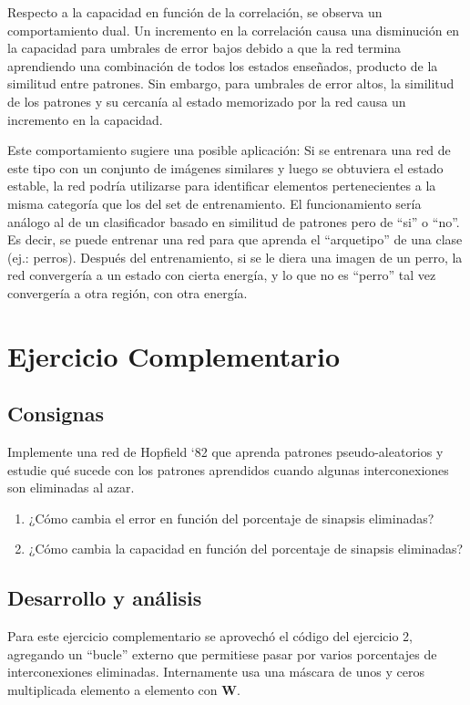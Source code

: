 \documentclass[11pt]{article} %
\begin{document}
Respecto a la capacidad en función de la correlación, se observa un comportamiento dual. Un incremento en la correlación causa una disminución en la capacidad para umbrales de error bajos debido a que la red termina aprendiendo una combinación de todos los estados enseñados, producto de la similitud entre patrones. Sin embargo, para umbrales de error altos, la similitud de los patrones y su cercanía al estado memorizado por la red causa un incremento en la capacidad. 

Este comportamiento sugiere una posible aplicación: Si se entrenara una red de este tipo con un conjunto de imágenes similares y luego se obtuviera el estado estable, la red podría utilizarse para identificar elementos pertenecientes a la misma categoría que los del set de entrenamiento. El funcionamiento sería análogo al de un clasificador basado en similitud de patrones pero de ``si'' o ``no''. Es decir, se puede entrenar una red para que aprenda el ``arquetipo'' de una clase (ej.: perros). Después del entrenamiento, si se le diera una imagen de un perro, la red convergería a un estado con cierta energía, y lo que no es ``perro'' tal vez convergería a otra región, con otra energía. 

\newpage
\section{Ejercicio Complementario}
\subsection{Consignas}

Implemente una red de Hopfield ‘82 que aprenda patrones pseudo-aleatorios y estudie qué sucede con los patrones aprendidos cuando algunas interconexiones son eliminadas al azar.
\begin{enumerate}
\item ¿Cómo cambia el error en función del porcentaje de sinapsis eliminadas?
\item ¿Cómo cambia la capacidad en función del porcentaje de sinapsis eliminadas?
\end{enumerate}

\subsection{Desarrollo y análisis}
Para este ejercicio complementario se aprovechó el código del ejercicio 2, agregando un ``bucle'' externo que permitiese pasar por varios porcentajes de interconexiones eliminadas. Internamente usa una máscara de unos y ceros multiplicada elemento a elemento con $\mathbf{W}$. 
\end{document}
